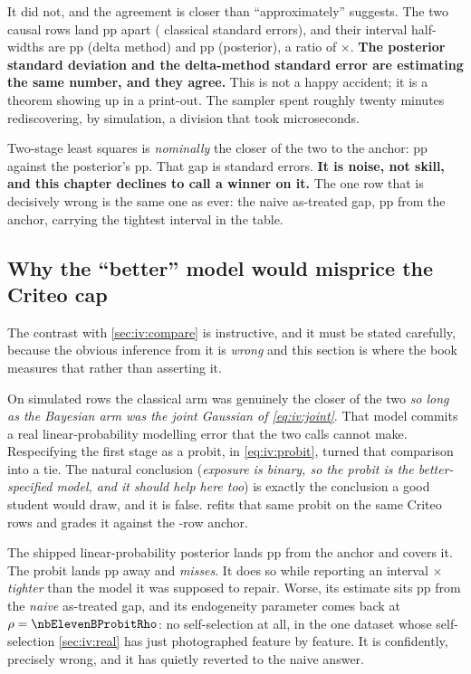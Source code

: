 It did not, and the agreement is closer than ``approximately'' suggests. The two causal rows land
\nbElevenBAgreePp{} pp apart (\nbElevenBAgreeSes{} classical standard errors), and their
interval half-widths are \nbElevenBHalfClassical{} pp (delta method) and \nbElevenBHalfBayes{} pp
(posterior), a ratio of \nbElevenBWidthRatio$\times$. \textbf{The posterior standard deviation and
the delta-method standard error are estimating the same number, and they agree.} This is not a happy
accident; it is a theorem \citep{vandervaart1998} showing up in a print-out. The sampler spent
roughly twenty minutes rediscovering, by simulation, a division that took microseconds.

Two-stage least squares is \emph{nominally} the closer of the two to the anchor:
\nbElevenBFitWaldErr{} pp against the posterior's \nbElevenBPostErr{} pp. That gap is
\nbElevenBErrGapSes{} standard errors. \textbf{It is noise, not skill, and this chapter declines to
call a winner on it.} The one row that is decisively wrong is the same one as ever: the naive
as-treated gap, \nbElevenBFitNaiveErr{} pp from the anchor, carrying the tightest interval in the
table.

\subsection*{Why the ``better'' model would misprice the Criteo cap}

The contrast with \cref{sec:iv:compare} is instructive, and it must be stated carefully, because the
obvious inference from it is \emph{wrong} and this section is where the book measures that rather
than asserting it.

On \nbElevenN{} simulated rows the classical arm was genuinely the closer of the two \emph{so long
as the Bayesian arm was the joint Gaussian of \cref{eq:iv:joint}}. That model commits a real
linear-probability modelling error that the two  calls cannot make. Respecifying the
first stage as a probit, in \cref{eq:iv:probit}, turned that comparison into a tie. The natural
conclusion (\emph{exposure is binary, so the probit is the better-specified model, and it should
help here too}) is exactly the conclusion a good student would draw, and it is false.
 refits that same probit on the same \nbElevenBNFit{} Criteo rows and grades
it against the \nbElevenBNFull{}-row anchor.



The shipped linear-probability posterior lands \nbElevenBLpmGap{} pp from the anchor and covers it.
The probit lands \nbElevenBProbitGap{} pp away and \emph{misses}. It does so while reporting
an interval \nbElevenBProbitWidthRatio$\times$ \emph{tighter} than the model it was supposed to
repair. Worse, its estimate sits \nbElevenBProbitNaiveDist{} pp from the \emph{naive} as-treated
gap, and its endogeneity parameter comes back at $\rho = \nbElevenBProbitRho$: no self-selection at
all, in the one dataset whose self-selection \cref{sec:iv:real} has just photographed feature by
feature. It is confidently, precisely wrong, and it has quietly reverted to the naive answer.

